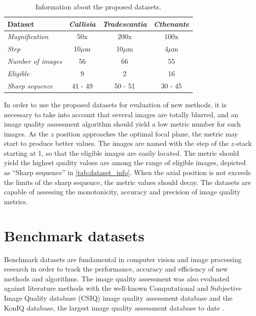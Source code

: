 \begin{table}[ht]
    \centering
    \caption{Information about the proposed datasets.}
    \label{tab:dataset_info}
    \begin{tabular}{lccc}
        \toprule
        \textbf{Dataset} & \textbf{\textit{Callisia}} &
        \textbf{\textit{Tradescantia}} &
        \textbf{\textit{Cthenante}}\\
        \midrule
        \textit{Magnification} & 50x & 200x & 100x\\
        \textit{Step} & 10$\mu$m & 10$\mu$m & 4$\mu$m\\
        \textit{Number of images} & 56 & 66 & 55\\
        \textit{Eligible} & 9 & 2 & 16\\
        \textit{Sharp sequence} & 41 - 49 & 50 - 51 & 30 - 45\\
        \bottomrule
    \end{tabular}
    \centering
    \fautor
\end{table}

In order to use the proposed datasets for evaluation of new methods, it is necessary to take into account that several images are totally blurred, and an image quality assessment algorithm should yield a low metric number for such images. As the $z$ position approaches the optimal focal plane, the metric may start to produce better values. The images are named with the step of the $z$-stack starting at 1, so that the eligible images are easily located. The metric should yield the highest quality values are among the range of eligible images, depicted as 
``Sharp sequence'' in \autoref{tab:dataset_info}. When the axial position is not exceeds the limits of the sharp sequence, the metric values should decay. The datasets are capable of assessing the monotonicity, accuracy and precision of image quality metrics.

\section{Benchmark datasets}

Benchmark datasets are fundamental in computer vision and image processing research in order to track the performance, accuracy and efficiency of new methods and algorithms. The image quality assessment was also evaluated against literature methods with the well-known Computational and Subjective Image Quality database (CSIQ) image quality assessment database \cite{larson2010most} and the KonIQ database, the largest image quality assessment database to date \cite{hosu2020koniq}. 


